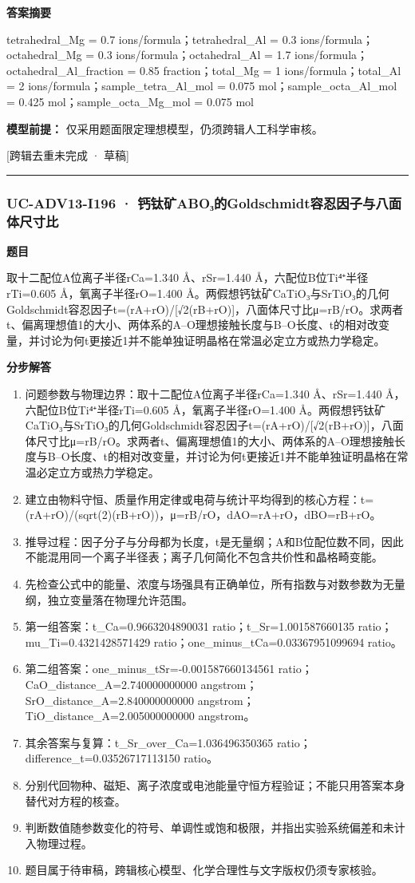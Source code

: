 \documentclass[UTF8,11pt,a4paper]{ctexart}
\begin{document}
\noindent\textbf{答案摘要}\par
tetrahedral\_Mg = 0.7 ions/formula；tetrahedral\_Al = 0.3 ions/formula；octahedral\_Mg = 0.3 ions/formula；octahedral\_Al = 1.7 ions/formula；octahedral\_Al\_fraction = 0.85 fraction；total\_Mg = 1 ions/formula；total\_Al = 2 ions/formula；sample\_tetra\_Al\_mol = 0.075 mol；sample\_octa\_Al\_mol = 0.425 mol；sample\_octa\_Mg\_mol = 0.075 mol\par
\noindent\textbf{模型前提：}
仅采用题面限定理想模型，仍须跨辑人工科学审核。\par
\noindent\textcolor{red!65!black}{[跨辑去重未完成 · 草稿]} \par
\medskip\hrule\medskip
{}
\subsubsection*{UC-ADV13-I196 · 钙钛矿ABO₃的Goldschmidt容忍因子与八面体尺寸比}
\noindent\textbf{题目}\par
取十二配位A位离子半径rCa=1.340 Å、rSr=1.440 Å，六配位B位Ti⁴⁺半径rTi=0.605 Å，氧离子半径rO=1.400 Å。两假想钙钛矿CaTiO₃与SrTiO₃的几何Goldschmidt容忍因子t=(rA+rO)/[√2(rB+rO)]，八面体尺寸比μ=rB/rO。求两者t、偏离理想值1的大小、两体系的A–O理想接触长度与B–O长度、t的相对改变量，并讨论为何t更接近1并不能单独证明晶格在常温必定立方或热力学稳定。\par
\medskip\noindent\textbf{分步解答}
\begin{enumerate}
\item 问题参数与物理边界：取十二配位A位离子半径rCa=1.340 Å、rSr=1.440 Å，六配位B位Ti⁴⁺半径rTi=0.605 Å，氧离子半径rO=1.400 Å。两假想钙钛矿CaTiO₃与SrTiO₃的几何Goldschmidt容忍因子t=(rA+rO)/[√2(rB+rO)]，八面体尺寸比μ=rB/rO。求两者t、偏离理想值1的大小、两体系的A–O理想接触长度与B–O长度、t的相对改变量，并讨论为何t更接近1并不能单独证明晶格在常温必定立方或热力学稳定。
\item 建立由物料守恒、质量作用定律或电荷与统计平均得到的核心方程：t=(rA+rO)/(sqrt(2)(rB+rO))，μ=rB/rO，dAO=rA+rO，dBO=rB+rO。
\item 推导过程：因子分子与分母都为长度，t是无量纲；A和B位配位数不同，因此不能混用同一个离子半径表；离子几何简化不包含共价性和晶格畸变能。
\item 先检查公式中的能量、浓度与场强具有正确单位，所有指数与对数参数为无量纲，独立变量落在物理允许范围。
\item 第一组答案：t\_Ca=0.9663204890031 ratio；t\_Sr=1.001587660135 ratio；mu\_Ti=0.4321428571429 ratio；one\_minus\_tCa=0.03367951099694 ratio。
\item 第二组答案：one\_minus\_tSr=-0.001587660134561 ratio；CaO\_distance\_A=2.740000000000 angstrom；SrO\_distance\_A=2.840000000000 angstrom；TiO\_distance\_A=2.005000000000 angstrom。
\item 其余答案与复算：t\_Sr\_over\_Ca=1.036496350365 ratio；difference\_t=0.03526717113150 ratio。
\item 分别代回物种、磁矩、离子浓度或电池能量守恒方程验证；不能只用答案本身替代对方程的核查。
\item 判断数值随参数变化的符号、单调性或饱和极限，并指出实验系统偏差和未计入物理过程。
\item 题目属于待审稿，跨辑核心模型、化学合理性与文字版权仍须专家核验。
\end{enumerate}
\end{document}
